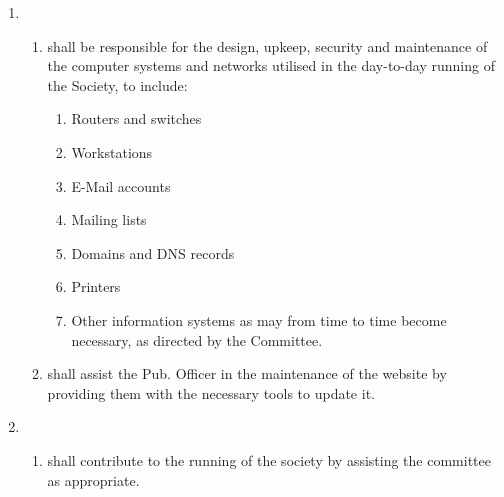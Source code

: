 \documentclass[a4paper]{tufte-handout}
\begin{document}
\begin{enumerate}[resume]
    \item {}
        \begin{enumerate}
            \item shall be responsible for the design, upkeep, security and maintenance of the computer systems and networks utilised in the day-to-day running of the Society, to include:
                \begin{enumerate}
                    \item Routers and switches
                    \item Workstations
                    \item E-Mail accounts
                    \item Mailing lists
                    \item Domains and DNS records
                    \item Printers
                    \item Other information systems as may from time to time become necessary, as directed by the Committee.
                \end{enumerate}
            \item shall assist the Pub. Officer in the maintenance of the website by providing them with the necessary tools to update it.
        \end{enumerate}        
        
    \item {}
        \begin{enumerate}
            \item shall contribute to the running of the society by assisting the committee as appropriate.
        \end{enumerate}
\end{enumerate}
\end{document}
